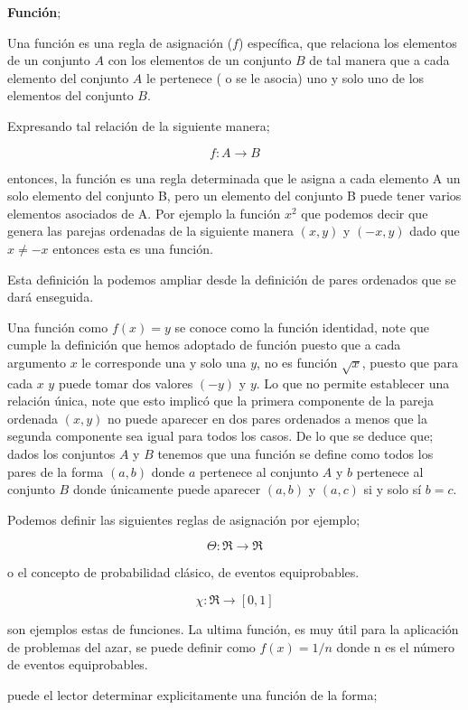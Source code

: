 \documentclass[12pt]{article}
\begin{document}
\textbf{Función};

Una  función es una regla de asignación ($f$) específica, que relaciona los elementos  de un conjunto $A$ con los elementos de un conjunto $B$ de tal manera que a cada elemento del conjunto  $A$ le pertenece ( o se le asocia) uno y solo uno de los elementos del conjunto $B$.

Expresando tal relación de la siguiente manera;

$$ f: A \longrightarrow B $$

entonces, la función es una regla determinada que le asigna a cada elemento A un solo elemento del conjunto B, pero un elemento del conjunto B puede tener varios elementos asociados de A. Por ejemplo la función $x^{2}$ que podemos decir que genera las parejas ordenadas de la siguiente manera  $(x,y)$ y $(-x,y)$ dado que $x\neq-x$ entonces esta es una función.

Esta definición la podemos ampliar desde la definición de pares ordenados que se dará enseguida.

Una función como $f(x)=y$ se conoce como la función identidad,  note que cumple la definición que hemos adoptado de función puesto que a cada  argumento $x$ le corresponde una y solo una $y$, no es función $\sqrt{x}$, puesto que para cada $x$  $y$ puede tomar dos valores $(-y)$ y $y$. Lo que no permite establecer una relación única, note que esto implicó que la primera componente de la pareja ordenada $(x,y)$  no puede aparecer en dos pares ordenados a menos que la segunda componente sea igual para todos los casos. De lo que se deduce que; dados los conjuntos $A$ y $B$ tenemos que una función se define como todos los pares de la forma $(a,b)$ donde $a$ pertenece al conjunto  $A$ y $b$ pertenece al conjunto $B$ donde únicamente puede aparecer $(a,b)$ y $(a,c)$ si y solo sí $b=c$.

Podemos definir las siguientes reglas de asignación por ejemplo;

$$ \Theta: \Re \longrightarrow \Re$$

o el concepto de probabilidad clásico, de eventos equiprobables.

$$ \chi: \Re \longrightarrow [0,1]$$

son ejemplos estas  de funciones. La ultima función, es muy útil para la aplicación de problemas del azar, se puede definir como $f(x)=1/n$ donde n es el número de eventos equiprobables.

puede el lector determinar explicitamente una función de la forma;
\end{document}

